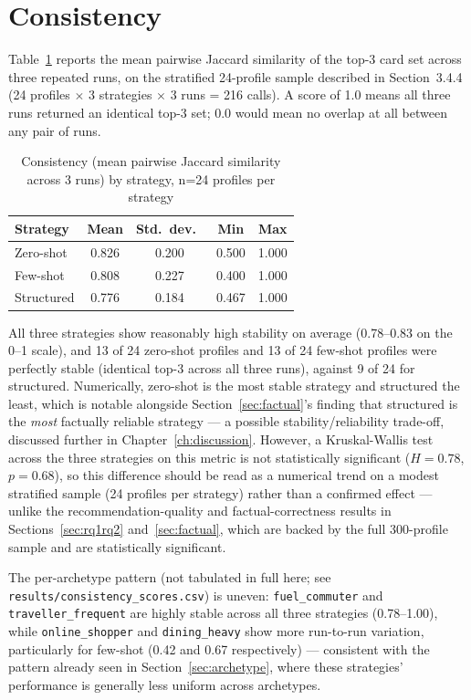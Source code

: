 \section{Consistency}
\label{sec:consistency-results}

Table~\ref{tab:consistency} reports the mean pairwise Jaccard similarity of the top-3 card set across three repeated runs, on the stratified 24-profile sample described in Section~3.4.4 (24 profiles $\times$ 3 strategies $\times$ 3 runs = 216 calls). A score of 1.0 means all three runs returned an identical top-3 set; 0.0 would mean no overlap at all between any pair of runs.

\begin{table}[htbp]
\centering
\caption{Consistency (mean pairwise Jaccard similarity across 3 runs) by strategy, n=24 profiles per strategy}
\label{tab:consistency}
\begin{tabular}{lcccc}
\toprule
Strategy & Mean & Std.\ dev.\ & Min & Max \\
\midrule
Zero-shot   & 0.826 & 0.200 & 0.500 & 1.000 \\
Few-shot    & 0.808 & 0.227 & 0.400 & 1.000 \\
Structured  & 0.776 & 0.184 & 0.467 & 1.000 \\
\bottomrule
\end{tabular}
\end{table}

All three strategies show reasonably high stability on average (0.78--0.83 on the 0--1 scale), and 13 of 24 zero-shot profiles and 13 of 24 few-shot profiles were perfectly stable (identical top-3 across all three runs), against 9 of 24 for structured. Numerically, zero-shot is the most stable strategy and structured the least, which is notable alongside Section~\ref{sec:factual}'s finding that structured is the \textit{most} factually reliable strategy --- a possible stability/reliability trade-off, discussed further in Chapter~\ref{ch:discussion}. However, a Kruskal-Wallis test across the three strategies on this metric is not statistically significant ($H = 0.78$, $p = 0.68$), so this difference should be read as a numerical trend on a modest stratified sample (24 profiles per strategy) rather than a confirmed effect --- unlike the recommendation-quality and factual-correctness results in Sections~\ref{sec:rq1rq2} and~\ref{sec:factual}, which are backed by the full 300-profile sample and are statistically significant.

The per-archetype pattern (not tabulated in full here; see \texttt{results/consistency\_scores.csv}) is uneven: \texttt{fuel\_commuter} and \texttt{traveller\_frequent} are highly stable across all three strategies (0.78--1.00), while \texttt{online\_shopper} and \texttt{dining\_heavy} show more run-to-run variation, particularly for few-shot (0.42 and 0.67 respectively) --- consistent with the pattern already seen in Section~\ref{sec:archetype}, where these strategies' performance is generally less uniform across archetypes.

